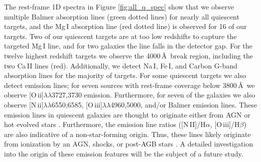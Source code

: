 \documentclass[twocolumn, astrosymb]{aastex631}
\begin{document}
The rest-frame 1D spectra in Figure \ref{fig:all_q_spec} show that we observe multiple Balmer absorption lines (green dotted lines) for nearly all quiescent targets, and the Mg\,I absorption line (red dotted line) is observed for 16 of our targets. Two of our quiescent targets are at too low redshifts to capture the targeted Mg\,I line, and for two galaxies the line falls in the detector gap. For the twelve highest redshift targets we observe the 4000\,\AA\ break region, including the two Ca\,II lines (red). Additionally, we detect Na\,I, Fe\,I, and Carbon G-band absorption lines for the majority of targets. For some quiescent targets we also detect emission lines; for seven sources with rest-frame coverage below $3800$\,\AA\ we observe [O\,{\sc ii}]$\lambda\lambda$3727,3730 emission. Furthermore, for seven of the galaxies we also observe [N\,{\sc ii}]$\lambda\lambda$6550,6585, [O\,{\sc iii}]$\lambda\lambda$4960,5000, and/or Balmer emission lines. These emission lines in quiescent galaxies are thought to originate either from AGN or hot evolved stars \citep[e.g.][]{RYan2006,FBelfiore2016,MMaseda2021,SBelli2021}. Furthermore, the emission line ratios ([N\,II]/H$\alpha$, [O\,{\sc iii}]/H$\beta$) are also indicative of a non-star-forming origin. Thus, these lines likely originate from ionization by an AGN, shocks, or post-AGB stars \citep[e.g.][]{RYan2012}. A detailed investigation into the origin of these emission features will be the subject of a future study.
\end{document}

